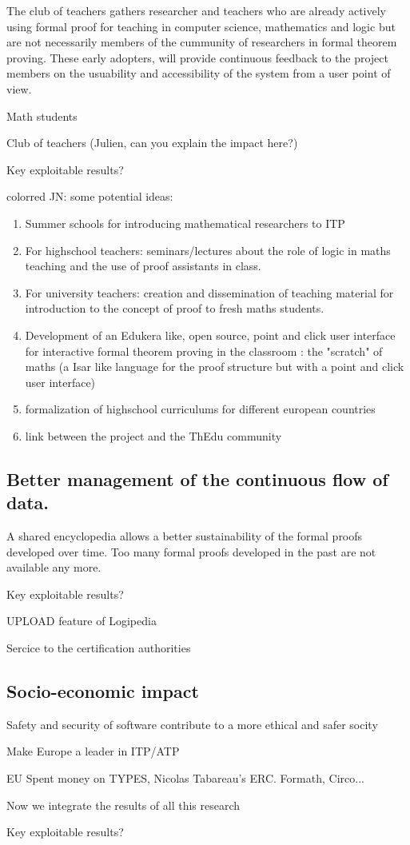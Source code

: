 The club of teachers gathers researcher and teachers who are already actively using formal proof for teaching in computer science, mathematics and logic but are not necessarily members of the cummunity of researchers in formal theorem proving. These early adopters, will provide continuous feedback to the project members on the usuability and accessibility of the system from a user point of view.

Math students 

{\color{red} Club of teachers (Julien, can you explain the impact here?)}

{\color{red} Key exploitable results?}

{color{red} JN:  some potential ideas:}
\begin{enumerate}
\item Summer schools for introducing mathematical researchers to ITP
\item For highschool teachers: seminars/lectures about  the role of logic in maths teaching and the use of proof assistants in class.
\item For university teachers: creation and dissemination of teaching material for introduction to the concept of proof to fresh maths students.   
\item Development of an Edukera like, open source, point and click user interface for interactive formal theorem proving in the classroom : the "scratch" of maths  (a Isar like language for the proof structure but with a point and click user interface)
\item formalization of  highschool curriculums for different european countries
\item link between the project and the ThEdu community
\end{enumerate}

\subsection{Better management of the continuous flow of data.}

A shared encyclopedia allows a better sustainability of the formal
proofs developed over time. Too many formal proofs developed in the
past are not available any more.

{\color{red} Key exploitable results?}

UPLOAD feature of Logipedia

Sercice to the certification authorities

\subsection{Socio-economic impact}

{\color{red} Safety and security of software contribute to a more ethical
  and safer socity}

Make Europe a leader in ITP/ATP

EU Spent money on TYPES, Nicolas Tabareau's ERC. Formath, Circo... 

Now we integrate the results of all this research

{\color{red} Key exploitable results?}
